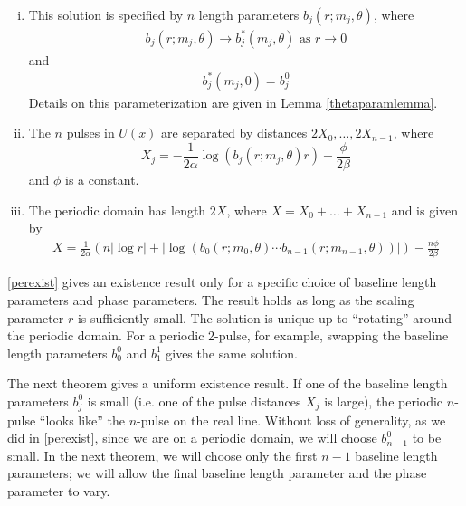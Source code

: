 \documentclass[thesis.tex]{subfiles}
\begin{document}
\begin{theorem}
\begin{enumerate}[(i)]
\item This solution is specified by $n$ length parameters $b_j(r; m_j, \theta)$, where
\begin{align}
b_j(r; m_j, \theta) \rightarrow b^*_j(m_j, \theta) \text{ as } r \rightarrow 0
\end{align}
and
\begin{align}
b^*_j(m_j, 0) = b_j^0
\end{align}
Details on this parameterization are given in Lemma \ref{thetaparamlemma}.

\item The $n$ pulses in $U(x)$ are separated by distances $2 X_0, \dots, 2 X_{n-1}$, where 
\begin{equation}\label{Xj}
X_j = -\frac{1}{2\alpha}\log(b_j(r; m_j, \theta) r) - \frac{\phi}{2 \beta} 
\end{equation}
and $\phi$ is a constant.

\item The periodic domain has length $2X$, where $X = X_0 + \dots + X_{n-1}$ and is given by
\begin{align}\label{Xdomain}
X = \frac{1}{2\alpha} \left(n |\log r| + |\log(b_0(r; m_0, \theta) \cdots b_{n-1}(r; m_{n-1}, \theta))| \right) - \frac{n \phi}{2 \beta}
\end{align}

\end{enumerate}
\end{theorem}

\begin{remark}
\cref{perexist} gives an existence result only for a specific choice of baseline length parameters and phase parameters. The result holds as long as the scaling parameter $r$ is sufficiently small. The solution is unique up to ``rotating'' around the periodic domain. For a periodic 2-pulse, for example, swapping the baseline length parameters $b_0^0$ and $b_1^1$ gives the same solution.
\end{remark}

The next theorem gives a uniform existence result.
If one of the baseline length parameters $b_j^0$ is small (i.e. one of the pulse distances $X_j$ is large), the periodic $n$-pulse ``looks like'' the $n$-pulse on the real line. Without loss of generality, as we did in \cref{perexist}, since we are on a periodic domain, we will choose $b_{n-1}^0$ to be small. In the next theorem, we will choose only the first $n-1$ baseline length parameters; we will allow the final baseline length parameter and the phase parameter to vary. 
\end{document}

